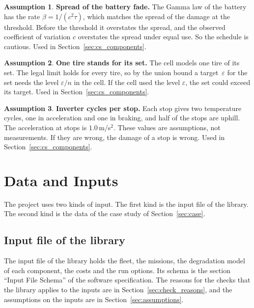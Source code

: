 \documentclass[11pt,a4paper]{article}
\theoremstyle{plain}
\theoremstyle{definition}
\newtheorem{assumption}{Assumption}
\theoremstyle{remark}
\begin{document}
\begin{assumption}\label{as:fade_spread}
\textbf{Spread of the battery fade.}
The Gamma law of the battery has the rate $\beta = 1/(c^2\tau)$, which matches the spread of the damage at the threshold.
Before the threshold it overstates the spread, and the observed coefficient of variation $c$ overstates the spread under equal use.
So the schedule is cautious.
Used in Section~\ref{sec:cs_components}.
\end{assumption}

\begin{assumption}\label{as:tire_set}
\textbf{One tire stands for its set.}
The cell models one tire of its set.
The legal limit holds for every tire, so by the union bound a target~$\varepsilon$ for the set needs the level $\varepsilon/n$ in the cell.
If the cell used the level $\varepsilon$, the set could exceed its target.
Used in Section~\ref{sec:cs_components}.
\end{assumption}

\begin{assumption}\label{as:inverter_cycles}
\textbf{Inverter cycles per stop.}
Each stop gives two temperature cycles, one in acceleration and one in braking, and half of the stops are uphill.
The acceleration at stops is $1.0$\,m/s$^2$.
These values are assumptions, not measurements.
If they are wrong, the damage of a stop is wrong.
Used in Section~\ref{sec:cs_components}.
\end{assumption}

\section{Data and Inputs}
\label{sec:data}

The project uses two kinds of input.
The first kind is the input file of the library.
The second kind is the data of the case study of Section~\ref{sec:case}.

\subsection{Input file of the library}

The input file of the library holds the fleet, the missions, the degradation model of each component, the costs and the run options.
Its schema is the section ``Input File Schema'' of the software specification.
The reasons for the checks that the library applies to the inputs are in Section~\ref{sec:check_reasons}, and the assumptions on the inputs are in Section~\ref{sec:assumptions}.
\end{document}
